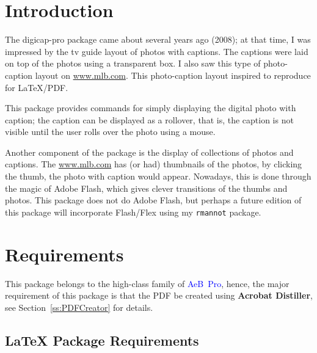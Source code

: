 \documentclass{article}
\begin{document}
\maketitle

\tableofcontents
{}

\section{Introduction}

The \textsf{digicap-pro} package came about several years ago (2008);
at that time, I was impressed by the tv guide layout of photos with
captions. The captions were laid on top of the photos using a
transparent box. I also saw this type of photo-caption layout on
\url{www.mlb.com}. This photo-caption layout inspired to reproduce
for {\LaTeX}/PDF.

This package provides commands for simply displaying the digital photo
with caption; the caption can be displayed as a rollover, that is, the caption
is not visible until the user rolls over the photo using a mouse.

Another component of the package is the display of collections of photos and captions.
The \url{www.mlb.com} has (or had) thumbnails of the photos, by clicking the thumb, the
photo with caption would appear.  Nowadays, this is done through the magic of Adobe Flash,
which gives clever transitions of the thumbs and photos. This package does not do Adobe Flash, but
perhaps a future edition of this package will incorporate Flash/Flex using my \texttt{rmannot} package.

\section{Requirements}

This package belongs to the high-class family of \textsf{\textcolor{blue}{AeB~Pro}}, hence,
the major requirement of this package is that the PDF be created using \textbf{Acrobat Distiller},
see Section~\ref*{ss:PDFCreator} for details.

\subsection{{\LaTeX} Package Requirements}
\end{document}

